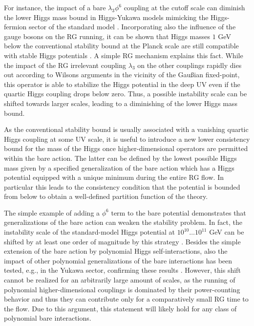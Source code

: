 \documentclass[twocolumn,aps,prd,showpacs,nofootinbib,superscriptaddress,preprintnumbers,floatfix,10pt]{revtex4-1}
\begin{document}
For instance, the impact of a bare $\lambda_{3}\phi^{6}$ coupling at the cutoff scale can diminish the lower Higgs mass bound in Higgs-Yukawa models mimicking the Higgs-fermion sector of the standard model \cite{Gies:2013fua,Gies:2014xha,Chu:2015nha}.
Incorporating also the influence of the gauge bosons on the RG running, it can be shown that Higgs masses $1$ GeV below the conventional stability bound at the Planck scale are still compatible with stable Higgs potentials \cite{Eichhorn:2015kea}.  A simple RG mechanism explains this fact. While the impact of the RG irrelevant coupling $\lambda_{3}$ on the other couplings rapidly dies out according to Wilsons arguments in the vicinity of the Gau{\ss}ian fixed-point, this operator is able to stabilize the Higgs potential in the deep UV even if the quartic Higgs coupling drops below zero. Thus, a possible instability scale can be shifted towards larger scales, leading to a diminishing of the lower Higgs mass bound. 


As the conventional stability bound is usually associated with a vanishing quartic Higgs coupling at some UV scale, it is useful to introduce a new lower consistency bound for the mass of the Higgs once higher-dimensional operators are permitted within the bare action. 
The latter can be defined by the lowest possible Higgs mass given by a specified generalization of the bare action which has a Higgs potential equipped with a unique minimum during the entire RG flow. In particular this leads to the consistency condition that the potential is bounded from below to obtain a well-defined partition function of the theory. 


The simple example of adding a $\phi^{6}$ term to the bare potential demonstrates that generalizations of the bare action can weaken the stability problem. 
In fact, the instability scale of the standard-model Higgs potential at $10^{10}\dots 10^{11}$ GeV can be shifted by at least one order of magnitude by this strategy \cite{Eichhorn:2015kea}.
Besides the simple extension of the bare action by polynomial Higgs self-interactions, also the impact of other polynomial generalizations of the bare interactions has been tested, e.g., in the Yukawa sector, confirming these results \cite{Jakovac:2015kka,Gies:2017zwf}.
However, this shift cannot be realized for an arbitrarily large amount of scales, as the running of polynomial higher-dimensional couplings is dominated by their power-counting behavior and thus they can contribute only for a comparatively small RG time to the flow. 
Due to this argument, this statement will likely hold for any class of polynomial bare interactions. 
\end{document}
